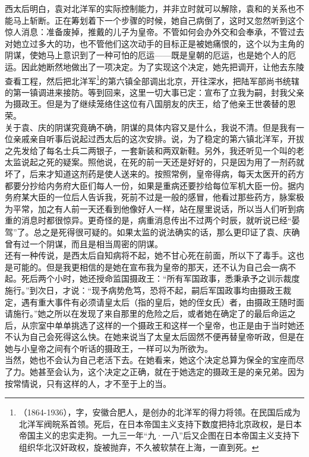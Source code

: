 西太后明白，袁对北洋军的实际控制能力，并非立时就可以解除，袁和的关系也不能马上斩断。正在筹划着下一个步骤的时候，她自己病倒了，这时又忽然听到这个惊人消息：准备废掉，推戴的儿子为皇帝。不管如何会办外交和会奉承，不管过去对她立过多大的功，也不管他们这次动手的目标正是被她痛恨的，这个以为主角的阴谋，使她马上意识到了一种可怕的厄运——既是皇朝的厄运，也是她个人的厄运。因此她断然地做出了一项决定。为了实现这个决定，她先把调开，让他去东陵查看工程，然后把北洋军\footnote{（1864-1936），字，安徽合肥人，是创办的北洋军的得力将领。在民国后成为北洋军阀皖系首领。死后，在日本帝国主义支持下数度把持北京政权，是日本帝国主义的忠实走狗。一九三一年“九·一八”后又企图在日本帝国主义支持下组织华北汉奸政权，旋被抛弃，不久被软禁在上海，一直到死。}的第六镇全部调出北京，开往深水，把陆军部尚书统辖的第一镇调进来接防。等到回来，这里一切大事已定：宣布了立我为嗣，封我父亲为摄政王。但是为了继续笼络住这位有八国朋友的庆王，给了他亲王世袭替的恩荣。\\

关于袁、庆的阴谋究竟确不确，阴谋的具体内容又是什么，我说不清。但是我有一位亲戚亲自听事后说起过西太后的这次安排。说，为了稳定的第六镇北洋军，开拔之先发给了每名士兵二两银子，一套新装和两双新鞋。另外，我还听见一个叫的老太监说起之死的疑案。照他说，在死的前一天还是好好的，只是因为用了一剂药就坏了，后来才知道这剂药是使人送来的。按照常例，皇帝得病，每天太医开的药方都要分抄给内务府大臣们每人一份，如果是重病还要抄给每位军机大臣一份。据内务府某大臣的一位后人告诉我，死前不过是一般的感冒，他看过那些药方，脉案极为平常，加之有人前一天还看到他像好人一样，站在屋里说话，所以当人们听到病重的消息时都很惊异。更奇怪的是，病重消息传出不过两个时辰，就听说已经“晏驾”了。总之是死得很可疑的。如果太监的说法确实的话，那么更印证了袁、庆确曾有过一个阴谋，而且是相当周密的阴谋。\\

还有一种传说，是西太后自知病将不起，她不甘心死在前面，所以下了毒手。这也是可能的。但是我更相信的是她在宣布我为皇帝的那天，还不认为自己会一病不起。死后两个小时，她还授命监国摄政王：“所有军国政事，悉秉承予之训示裁度施行。”到次日，才说：“现予病势危笃，恐将不起，嗣后军国政事均由摄政王裁定，遇有重大事件有必须请皇太后（指的皇后，她的侄女氏）者，由摄政王随时面请施行。”她之所以在发现了来自那里的危险之后，或者她在确定了的最后命运之后，从宗室中单单挑选了这样的一个摄政王和这样一个皇帝，也正是由于当时她还不认为自己会死得这么快。在她来说当了太皇太后固然不便再替皇帝听政，但是在她与小皇帝之间有个听话的摄政王，一样可以为所欲为。\\

当然，她也不会认为自己老活下去。在她看来，她这个决定总算为保全的宝座而尽了力。她甚至会认为，这个决定之正确，就在于她选定的摄政王是的亲兄弟。因为按常情说，只有这样的人，才不至于上的当。
